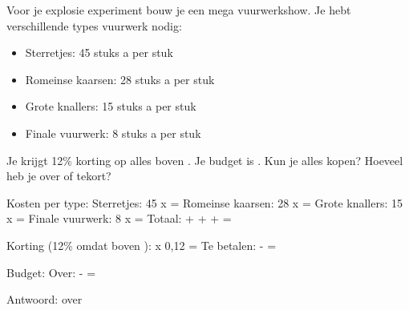 \begin{opgave}
Voor je explosie experiment bouw je een mega vuurwerkshow. Je hebt verschillende
types vuurwerk nodig:

\begin{itemize}
\item Sterretjes: 45 stuks a  per stuk
\item Romeinse kaarsen: 28 stuks a  per stuk
\item Grote knallers: 15 stuks a  per stuk
\item Finale vuurwerk: 8 stuks a  per stuk
\end{itemize}

Je krijgt 12\% korting op alles boven . Je budget is .
Kun je alles kopen? Hoeveel heb je over of tekort?
\end{opgave}

\begin{oplossing}
Kosten per type:
Sterretjes: 45 x  = 
Romeinse kaarsen: 28 x  = 
Grote knallers: 15 x  = 
Finale vuurwerk: 8 x  = 
Totaal:  +  +  +  = 

Korting (12\% omdat boven ):  x 0,12 = 
Te betalen:  -  = 

Budget: 
Over:  -  = 

Antwoord:  over
\end{oplossing}